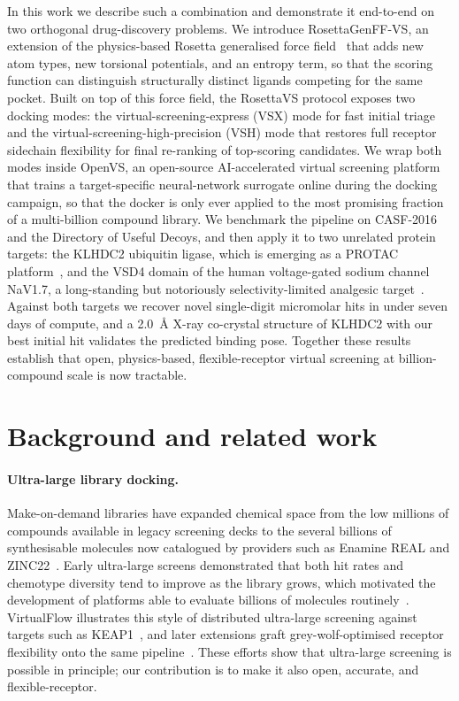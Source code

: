 \documentclass[11pt]{article}
\begin{document}
In this work we describe such a combination and demonstrate it end-to-end
on two orthogonal drug-discovery problems. We introduce RosettaGenFF-VS,
an extension of the physics-based Rosetta generalised force
field~\citep{leman2020rosetta} that adds new atom types, new torsional
potentials, and an entropy term, so that the scoring function can
distinguish structurally distinct ligands competing for the same pocket.
Built on top of this force field, the RosettaVS protocol exposes two
docking modes: the virtual-screening-express (VSX) mode for fast initial
triage and the virtual-screening-high-precision (VSH) mode that restores
full receptor sidechain flexibility for final re-ranking of top-scoring
candidates. We wrap both modes inside OpenVS, an open-source
AI-accelerated virtual screening platform that trains a target-specific
neural-network surrogate online during the docking campaign, so that the
docker is only ever applied to the most promising fraction of a
multi-billion compound library. We benchmark the pipeline on CASF-2016
and the Directory of Useful Decoys, and then apply it to two unrelated
protein targets: the KLHDC2 ubiquitin ligase, which is emerging as a
PROTAC platform~\citep{slusarz2023klhdc3}, and the VSD4 domain of the
human voltage-gated sodium channel NaV1.7, a long-standing but
notoriously selectivity-limited analgesic
target~\citep{wang2015nav17methyl}. Against both targets we recover novel
single-digit micromolar hits in under seven days of compute, and a 2.0~\AA{}
X-ray co-crystal structure of KLHDC2 with our best initial hit validates
the predicted binding pose. Together these results establish that open,
physics-based, flexible-receptor virtual screening at billion-compound
scale is now tractable.

\section{Background and related work}

\paragraph{Ultra-large library docking.}
Make-on-demand libraries have expanded chemical space from the low millions
of compounds available in legacy screening decks to the several billions
of synthesisable molecules now catalogued by providers such as Enamine REAL
and ZINC22~\citep{lyu2019ultralarge,tingle2023zinc22}. Early ultra-large
screens demonstrated that both hit rates and chemotype diversity tend to
improve as the library grows, which motivated the development of
platforms able to evaluate billions of molecules
routinely~\citep{lyu2019ultralarge,gorgulla2020virtualflow}. VirtualFlow
illustrates this style of distributed ultra-large screening against
targets such as KEAP1~\citep{gorgulla2020virtualflow}, and later
extensions graft grey-wolf-optimised receptor flexibility onto the same
pipeline~\citep{gorgulla2020virtualflowgwo}. These efforts show that
ultra-large screening is possible in principle; our contribution is to
make it also open, accurate, and flexible-receptor.
\end{document}

